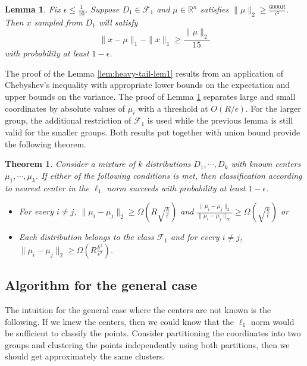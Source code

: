\documentclass[11pt,letter]{article}
\newtheorem{theorem}{Theorem}
\newtheorem{lemma}{Lemma}
\begin{document}
\begin{lemma} \label{lem:heavy-tail-lem2}
Fix $\epsilon \leq \frac{1}{10}$. Suppose $D_1 \in \mathcal F_1$ and $\mu \in \mathbb{R}^n$ satisfies $\|\mu\|_2 \geq \frac{6000R}{\epsilon^2}$. Then $x$ sampled from $D_1$ will satisfy 
$$\|x - \mu\|_1 - \|x\|_1 \geq \frac{\|\mu\|_2}{15}$$
with probability at least $1-\epsilon$. 
\end{lemma}

The proof of the Lemma \ref{lem:heavy-tail-lem1} results from an application of Chebyshev's inequality with appropriate lower bounds on the expectation and upper bounds on the variance. The proof of Lemma \ref{lem:heavy-tail-lem2} separates large and small coordinates by absolute values of $\mu_i$ with a threshold at $O(R/\epsilon)$. For the larger group, the additional restriction of $\mathcal F_1$ is used while the previous lemma is still valid for the smaller groups. Both results put together with union bound %
provide the following theorem. 

\begin{theorem}
Consider a mixture of $k$ distributions $D_1,\cdots,D_k$ with known centers $\mu_1,\cdots,\mu_k$. If either of the following conditions is met, then classification according to nearest center in the $\ell_1$ norm succeeds with probability at least $1-\epsilon$.

\begin{itemize}
	\item For every $i\not=j$, $\|\mu_i - \mu_j\|_2 \geq \Omega\left( R \sqrt{\frac{k}{\epsilon}}\right)$ and $\frac{\|\mu_i - \mu_j\|_2}{\|\mu_i - \mu_j\|_\infty} \geq \Omega \left( \sqrt{\frac{k}{\epsilon}}\right)$ or
	\item Each distribution belongs to the class $\mathcal F_1$ and for every $i\not= j$, $\|\mu_i - \mu_j\|_2 \geq \Omega\left(R\frac{k^2}{\epsilon^2}\right)$.
	
\end{itemize}
\end{theorem}

\subsection{Algorithm for the general case}

The intuition for the general case where the centers are not known is the following. If we knew the centers, then we could know that the $\ell_1$ norm would be sufficient to classify the points. Consider partitioning the coordinates into two groups and clustering the points independently using both partitions, then we should get approximately the same clusters. 
\end{document}
